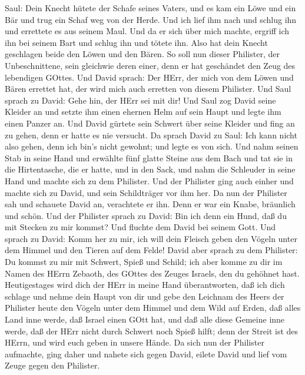 Saul: Dein Knecht hütete der Schafe seines Vaters, und es kam ein Löwe
und ein Bär und trug ein Schaf weg von der Herde.  Und ich
lief ihm nach und schlug ihn und errettete es aus seinem Maul. Und da er
sich über mich machte, ergriff ich ihn bei seinem Bart und schlug ihn
und tötete ihn.  Also hat dein Knecht geschlagen beide den
Löwen und den Bären. So soll nun dieser Philister, der Unbeschnittene,
sein gleichwie deren einer, denn er hat geschändet den Zeug des
lebendigen GOttes.  Und David sprach: Der HErr, der mich
von dem Löwen und Bären errettet hat, der wird mich auch erretten von
diesem Philister.  Und Saul sprach zu David: Gehe hin, der
HErr sei mit dir! Und Saul zog David seine Kleider an und setzte ihm
einen ehernen Helm auf sein Haupt und legte ihm einen Panzer an.
 Und David gürtete sein Schwert über seine Kleider und fing
an zu gehen, denn er hatte es nie versucht. Da sprach David zu Saul: Ich
kann nicht also gehen, denn ich bin's nicht gewohnt; und legte es von
sich.  Und nahm seinen Stab in seine Hand und erwählte fünf
glatte Steine aus dem Bach und tat sie in die Hirtentasche, die er
hatte, und in den Sack, und nahm die Schleuder in seine Hand und machte
sich zu dem Philister.  Und der Philister ging auch einher
und machte sich zu David, und sein Schildträger vor ihm her.
 Da nun der Philister sah und schauete David an, verachtete
er ihn. Denn er war ein Knabe, bräunlich und schön.  Und
der Philister sprach zu David: Bin ich denn ein Hund, daß du mit Stecken
zu mir kommst? Und fluchte dem David bei seinem Gott.  Und
sprach zu David: Komm her zu mir, ich will dein Fleisch geben den Vögeln
unter dem Himmel und den Tieren auf dem Felde!  David aber
sprach zu dem Philister: Du kommst zu mir mit Schwert, Spieß und Schild;
ich aber komme zu dir im Namen des HErrn Zebaoth, des GOttes des Zeuges
Israels, den du gehöhnet hast.  Heutigestages wird dich der
HErr in meine Hand überantworten, daß ich dich schlage und nehme dein
Haupt von dir und gebe den Leichnam des Heers der Philister heute den
Vögeln unter dem Himmel und dem Wild auf Erden, daß alles Land inne
werde, daß Israel einen GOtt hat,  und daß alle diese
Gemeine inne werde, daß der HErr nicht durch Schwert noch Spieß hilft;
denn der Streit ist des HErrn, und wird euch geben in unsere Hände.
 Da sich nun der Philister aufmachte, ging daher und nahete
sich gegen David, eilete David und lief vom Zeuge gegen den Philister.
